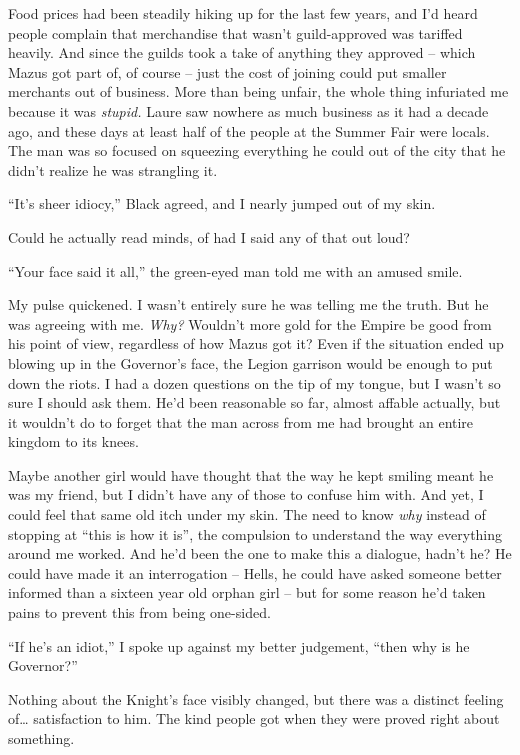 \documentclass[12pt, openany]{book}
\begin{document}
Food prices had been steadily hiking up for the last few years, and I’d heard people complain that merchandise that wasn’t guild-approved was tariffed heavily. And since the guilds took a take of anything they approved – which Mazus got part of, of course – just the cost of joining could put smaller merchants out of business. More than being unfair, the whole thing infuriated me because it was \textit{stupid.} Laure saw nowhere as much business as it had a decade ago, and these days at least half of the people at the Summer Fair were locals. The man was so focused on squeezing everything he could out of the city that he didn’t realize he was strangling it.

“It’s sheer idiocy,” Black agreed, and I nearly jumped out of my skin.

Could he actually read minds, of had I said any of that out loud?

“Your face said it all,” the green-eyed man told me with an amused smile.

My pulse quickened. I wasn’t entirely sure he was telling me the truth. But he was agreeing with me. \textit{Why? }Wouldn’t more gold for the Empire be good from his point of view, regardless of how Mazus got it? Even if the situation ended up blowing up in the Governor’s face, the Legion garrison would be enough to put down the riots. I had a dozen questions on the tip of my tongue, but I wasn’t so sure I should ask them. He’d been reasonable so far, almost affable actually, but it wouldn’t do to forget that the man across from me had brought an entire kingdom to its knees. 

Maybe another girl would have thought that the way he kept smiling meant he was my friend, but I didn’t have any of those to confuse him with. And yet, I could feel that same old itch under my skin. The need to know \textit{why }instead of stopping at “this is how it is”, the compulsion to understand the way everything around me worked. And he’d been the one to make this a dialogue, hadn’t he? He could have made it an interrogation – Hells, he could have asked someone better informed than a sixteen year old orphan girl – but for some reason he’d taken pains to prevent this from being one-sided.

“If he’s an idiot,” I spoke up against my better judgement, “then why is he Governor?”

Nothing about the Knight’s face visibly changed, but there was a distinct feeling of… satisfaction to him. The kind people got when they were proved right about something.
\end{document}
